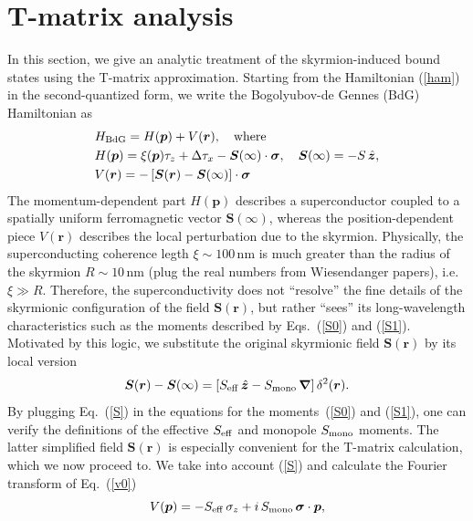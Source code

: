 \documentclass[twocolumn,showpacs,floatfix,nofootinbib,longbibliography]{revtex4-1}
\begin{document}
\section{T-matrix analysis} \label{sec:appendixTMatrix}
In this section, we give an analytic treatment of the skyrmion-induced bound states using the T-matrix approximation. Starting from the Hamiltonian (\ref{ham}) in the second-quantized form, we write the Bogolyubov-de Gennes (BdG) Hamiltonian as 
\begin{align}
	& H_{\rm BdG} = H(\bm p) + V(\bm r),\quad {\rm where} \nonumber \\
& H(\bm p) = \xi(\bm p)\tau_z+\Delta \tau_x - \bm S(\infty)\cdot\bm\sigma,\quad \bm S(\infty) = -S\,\hat{\bm z}, \nonumber\\
& V(\bm r) = -\left[ \bm S(\bm r)-\bm S(\infty)\right]\cdot\bm\sigma \label{v0}
\end{align}
The momentum-dependent part $H(\bm p)$ describes a superconductor coupled to a spatially uniform ferromagnetic vector $\bm S(\infty)$, whereas the position-dependent piece $V(\bm r)$ describes the local perturbation due to the skyrmion. Physically, the superconducting coherence legth $\xi\sim 100$\,nm is much greater than the radius of the skyrmion $R\sim 10$\,nm (plug the real numbers from Wiesendanger papers), i.e. $\xi\gg R$. Therefore, the superconductivity does not ``resolve'' the fine details of the skyrmionic configuration of the field  $\bm S(\bm r)$, but rather ``sees'' its long-wavelength characteristics such as the moments described by Eqs.~(\ref{S0}) and (\ref{S1}). Motivated by this logic, we substitute the original skyrmionic field $\bm S(\bm r)$ by its local version 
\begin{equation}
	\bm S(\bm r) - \bm S(\infty) = \left[ S_{\rm eff}\, \hat{\bm z} - S_{\rm mono}\, \bm \nabla\right] \delta^2(\bm r).
	\label{S}
\end{equation}
By plugging Eq.~(\ref{S}) in the equations for the moments~(\ref{S0}) and (\ref{S1}), one can verify the definitions of the effective $S_{\rm eff}$ and monopole $S_{\rm mono}$ moments.  The latter simplified field $\bm S(\bm r)$ is especially convenient for the T-matrix calculation, which we now proceed to. We take into account (\ref{S}) and calculate the Fourier transform of Eq.~(\ref{v0})  
\begin{equation}
	V(\bm p) = -S_{\rm eff}\,\sigma_z +  i \,S_{\rm mono} \, \bm \sigma\cdot \bm  p,
	\label{vp}
\end{equation}
\end{document}

